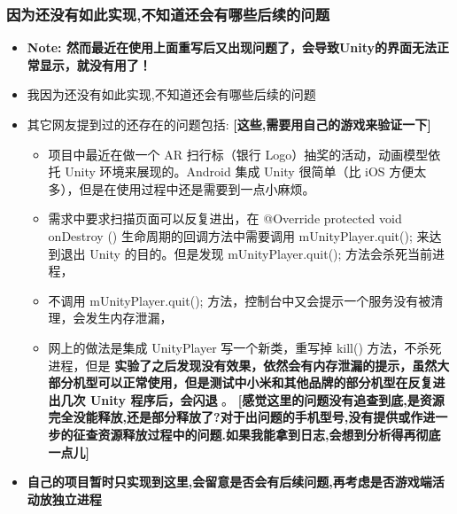 \documentclass[9pt, b5paper]{article}
\begin{document}
\subsubsection{因为还没有如此实现,不知道还会有哪些后续的问题}
\label{sec-1-2-2}
\begin{itemize}
\item \textbf{Note: 然而最近在使用上面重写后又出现问题了，会导致Unity的界面无法正常显示，就没有用了！}
\item 我因为还没有如此实现,不知道还会有哪些后续的问题
\item 其它网友提到过的还存在的问题包括: \textbf{[这些,需要用自己的游戏来验证一下]}
\begin{itemize}
\item 项目中最近在做一个 AR 扫行标（银行 Logo）抽奖的活动，动画模型依托 Unity 环境来展现的。Android 集成 Unity 很简单（比 iOS 方便太多），但是在使用过程中还是需要到一点小麻烦。
\item 需求中要求扫描页面可以反复进出，在 @Override protected void onDestroy () 生命周期的回调方法中需要调用 mUnityPlayer.quit(); 来达到退出 Unity 的目的。但是发现 mUnityPlayer.quit(); 方法会杀死当前进程，
\item 不调用 mUnityPlayer.quit(); 方法，控制台中又会提示一个服务没有被清理，会发生内存泄漏，
\item 网上的做法是集成 UnityPlayer 写一个新类，重写掉 kill() 方法，不杀死进程，但是 \textbf{实验了之后发现没有效果，依然会有内存泄漏的提示，虽然大部分机型可以正常使用，但是测试中小米和其他品牌的部分机型在反复进出几次 Unity 程序后，会闪退} 。 \textbf{[感觉这里的问题没有追查到底,是资源完全没能释放,还是部分释放了?对于出问题的手机型号,没有提供或作进一步的征查资源释放过程中的问题.如果我能拿到日志,会想到分析得再彻底一点儿]}
\end{itemize}
\item \textbf{自己的项目暂时只实现到这里,会留意是否会有后续问题,再考虑是否游戏端活动放独立进程}
\end{itemize}
\end{document}
